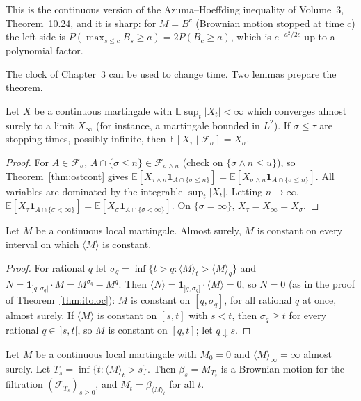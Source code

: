 This is the continuous version of the Azuma--Hoeffding inequality of Volume~3, Theorem~10.24, and it is sharp: for $M=B^{c}$ (Brownian motion stopped at time $c$) the left side is $P(\max_{s\le c}B_s\ge a)=2P(B_c\ge a)$,
which is $e^{-a^2/2c}$ up to a polynomial factor.

The clock of Chapter~3 can be used to change time. Two lemmas prepare the theorem.

\begin{lemma}\label{lem:ostL2}
Let $X$ be a continuous martingale with $\mathbb E\sup_t|X_t|<\infty$ which converges almost surely to a limit $X_\infty$ (for instance, a martingale bounded in $L^2$). If $\sigma\le\tau$ are stopping times, possibly infinite, then $\mathbb E[X_\tau\mid\mathcal F_\sigma]=X_\sigma$.
\end{lemma}

\begin{proof}
For $A\in\mathcal F_\sigma$, $A\cap\{\sigma\le n\}\in\mathcal F_{\sigma\wedge n}$ (check on $\{\sigma\wedge n\le u\}$), so Theorem~\ref{thm:ostcont} gives $\mathbb E[X_{\tau\wedge n}\mathbf 1_{A\cap\{\sigma\le n\}}]=\mathbb E[X_{\sigma\wedge n}\mathbf 1_{A\cap\{\sigma\le n\}}]$. All
variables are dominated by the integrable $\sup_t|X_t|$. Letting $n\to\infty$, $\mathbb E[X_\tau\mathbf 1_{A\cap\{\sigma<\infty\}}]=\mathbb E[X_\sigma\mathbf 1_{A\cap\{\sigma<\infty\}}]$. On $\{\sigma=\infty\}$, $X_\tau=X_\infty=X_\sigma$.
\end{proof}

\begin{lemma}\label{lem:constancy}
Let $M$ be a continuous local martingale. Almost surely, $M$ is constant on every interval on which $\langle M\rangle$ is constant.
\end{lemma}

\begin{proof}
For rational $q$ let $\sigma_q=\inf\{t>q:\langle M\rangle_t>\langle M\rangle_q\}$ and $N=\mathbf 1_{]q,\sigma_q]}\cdot M=M^{\sigma_q}-M^q$. Then $\langle N\rangle=\mathbf 1_{]q,\sigma_q]}\cdot\langle M\rangle=0$, so $N=0$ (as in the proof of
Theorem~\ref{thm:itoloc}): $M$ is constant on $[q,\sigma_q]$, for all rational $q$ at once, almost surely. If $\langle M\rangle$ is constant on $[s,t]$ with $s<t$, then $\sigma_q\ge t$ for every rational $q\in\,]s,t[$, so $M$ is
constant on $[q,t]$; let $q\downarrow s$.
\end{proof}

\begin{theorem}\label{thm:dds}
Let $M$ be a continuous local martingale with $M_0=0$ and $\langle M\rangle_\infty=\infty$ almost surely. Let $T_s=\inf\{t:\langle M\rangle_t>s\}$. Then $\beta_s=M_{T_s}$ is a Brownian motion for the filtration
$(\mathcal F_{T_s})_{s\ge0}$, and $M_t=\beta_{\langle M\rangle_t}$ for all $t$.
\end{theorem}

